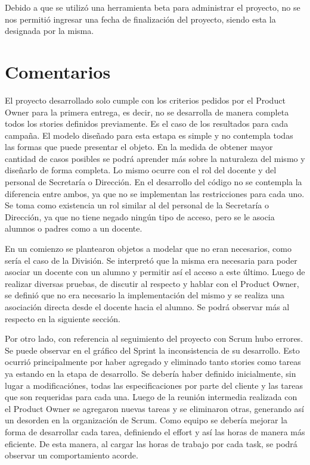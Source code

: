 \documentclass[a4paper, 11pt]{article}
\begin{document}
Debido a que se utilizó una herramienta beta para administrar el proyecto, no se nos permitió ingresar una fecha de finalización del proyecto, siendo esta la designada por la misma. 



\newpage

\section{Comentarios}
El proyecto desarrollado solo cumple con los criterios pedidos por el Product Owner para la primera entrega, es decir, no se desarrolla de manera completa todos los stories definidos previamente. 
Es el caso de los resultados para cada campaña. El modelo diseñado para esta estapa es simple y no contempla todas las formas que puede presentar el objeto. En la medida de obtener mayor cantidad de casos posibles se podrá aprender más sobre la naturaleza del mismo y diseñarlo de forma completa. 
Lo mismo ocurre con el rol del docente y del personal de Secretaría o Dirección. En el desarrollo del código no se contempla la diferencia entre ambos, ya que no se implementan las restricciones para cada uno. Se toma como existencia un rol similar al del personal de la Secretaría o Dirección, ya que no tiene negado ningún tipo de acceso, pero se le asocia alumnos o padres como a un docente. 

En un comienzo se plantearon objetos a modelar que no eran necesarios, como sería el caso de la División. Se interpretó que la misma era necesaria para poder asociar un docente con un alumno y permitir así el acceso a este último. Luego de realizar diversas pruebas, de discutir al respecto y hablar con el Product Owner, se definió que no era necesario la implementación del mismo y se realiza una asociación directa desde el docente hacia el alumno. Se podrá observar más al respecto en la siguiente sección. 

Por otro lado, con referencia al seguimiento del proyecto con Scrum hubo errores. Se puede observar en el gráfico del Sprint la inconsistencia de su desarrollo. Esto ocurrió principalmente por haber agregado y eliminado tanto stories como tareas ya estando en la etapa de desarrollo. Se debería haber definido inicialmente, sin lugar a modificaciónes, todas las especificaciones por parte del cliente y las tareas que son requeridas para cada una. Luego de la reunión intermedia realizada con el Product Owner se agregaron nuevas tareas y se eliminaron otras, generando así un desorden en la organización de Scrum. Como equipo se debería mejorar la forma de desarrollar cada tarea, definiendo el effort y así las horas de manera más eficiente. De esta manera, al cargar las horas de trabajo por cada task, se podrá observar un comportamiento acorde. 
\end{document}
